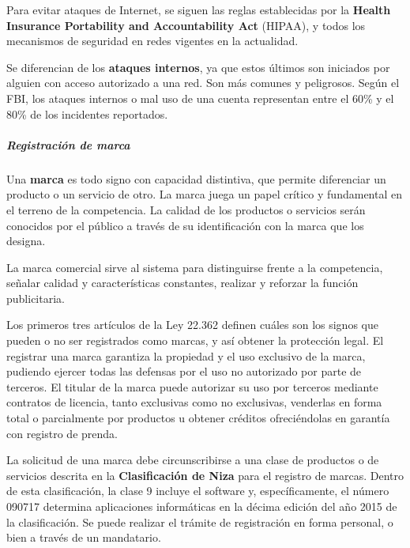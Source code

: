     Para evitar ataques de Internet, se siguen las reglas establecidas por la \textbf{Health Insurance Portability and Accountability Act} (HIPAA), y todos los mecanismos de seguridad en redes vigentes en la actualidad.

    Se diferencian de los \textbf{ataques internos}, ya que estos últimos son iniciados por alguien con acceso autorizado a una red.
    Son más comunes y peligrosos.
    Según el FBI, los ataques internos o mal uso de una cuenta representan entre el 60\% y el 80\% de los incidentes reportados.
    
    
\subparagraph{Registración de marca}
    
    Una \textbf{marca} es todo signo con capacidad distintiva, que permite diferenciar un producto o un servicio de otro.
    La marca juega un papel crítico y fundamental en el terreno de la competencia.
    La calidad de los productos o servicios serán conocidos por el público a través de su identificación con la marca que los designa.
    
    La marca comercial sirve al sistema para distinguirse frente a la competencia, señalar calidad y características constantes, realizar y reforzar la función publicitaria.
    
    Los primeros tres artículos de la Ley 22.362 definen cuáles son los signos que pueden o no ser registrados como marcas, y así obtener la protección legal.
    El registrar una marca garantiza la propiedad y el uso exclusivo de la marca, pudiendo ejercer todas las defensas por el uso no autorizado por parte de terceros.
    El titular de la marca puede autorizar su uso por terceros mediante contratos de licencia, tanto exclusivas como no exclusivas, venderlas en forma total o parcialmente por productos u obtener créditos ofreciéndolas en garantía con registro de prenda.
    
    La solicitud de una marca debe circunscribirse a una clase de productos o de servicios descrita en la \textbf{Clasificación de Niza} para el registro de marcas.
    Dentro de esta clasificación, la clase 9 incluye el software y, específicamente, el número 090717 determina aplicaciones informáticas en la décima edición del año 2015 de la clasificación.
    Se puede realizar el trámite de registración en forma personal, o bien a través de un mandatario.

